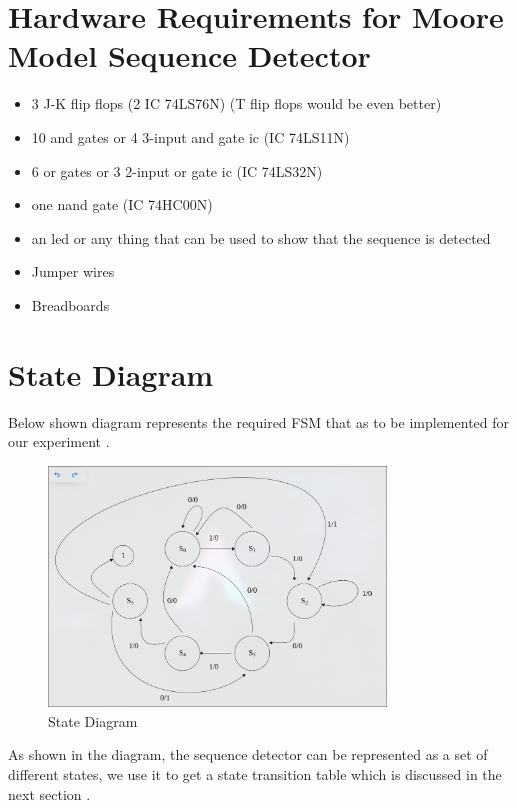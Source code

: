 \documentclass[a4paper,12pt]{article}
\begin{document}
\section{Hardware Requirements for Moore Model Sequence Detector}
\begin{itemize}
	\item 3 J-K flip flops (2 IC 74LS76N) (T flip flops would be even better)
	\item 10 and gates or 4 3-input and gate ic (IC 74LS11N)
	\item 6 or gates or 3 2-input or gate ic (IC 74LS32N)
	\item one nand gate (IC 74HC00N)
	\item an led or any thing that can be used to show that the sequence is detected
        \item Jumper wires 
	\item Breadboards 
\end{itemize}

\newpage

\section{State Diagram}

Below shown diagram represents the required FSM that as to be implemented for our experiment .
\begin{figure}[H]
    \centering
    \includegraphics[width=0.8\textwidth]{figs/state.png}
    \caption{State Diagram}
    \label{fig:your_image_label}
\end{figure}

As shown in the diagram, the sequence detector can be represented as a set of different states, we use it to get a state transition table which is discussed in the next section .
\end{document}
